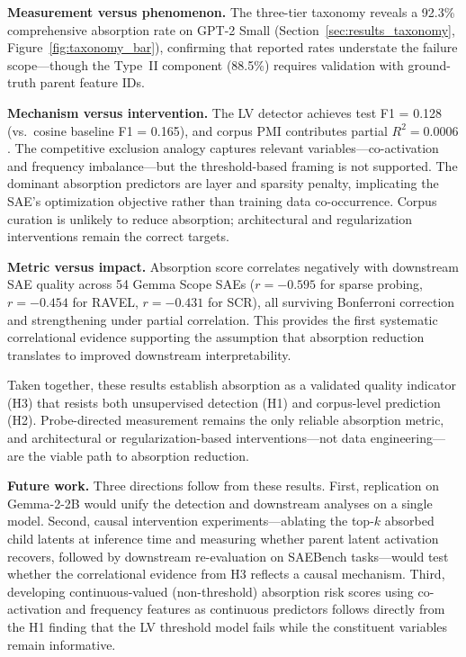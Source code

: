 \documentclass{article}
\begin{document}
\textbf{Measurement versus phenomenon.} The three-tier taxonomy reveals a 92.3\% comprehensive absorption rate on GPT-2 Small (Section~\ref{sec:results_taxonomy}, Figure~\ref{fig:taxonomy_bar}), confirming that reported rates understate the failure scope---though the Type~II component (88.5\%) requires validation with ground-truth parent feature IDs.

\textbf{Mechanism versus intervention.} The LV detector achieves test F1 = 0.128 (vs.\ cosine baseline F1 = 0.165), and corpus PMI contributes partial $R^2 = 0.0006$. The competitive exclusion analogy captures relevant variables---co-activation and frequency imbalance---but the threshold-based framing is not supported. The dominant absorption predictors are layer and sparsity penalty, implicating the SAE's optimization objective rather than training data co-occurrence. Corpus curation is unlikely to reduce absorption; architectural and regularization interventions remain the correct targets.

\textbf{Metric versus impact.} Absorption score correlates negatively with downstream SAE quality across 54 Gemma Scope SAEs ($r = -0.595$ for sparse probing, $r = -0.454$ for RAVEL, $r = -0.431$ for SCR), all surviving Bonferroni correction and strengthening under partial correlation. This provides the first systematic correlational evidence supporting the assumption that absorption reduction translates to improved downstream interpretability.

Taken together, these results establish absorption as a validated quality indicator (H3) that resists both unsupervised detection (H1) and corpus-level prediction (H2). Probe-directed measurement remains the only reliable absorption metric, and architectural or regularization-based interventions---not data engineering---are the viable path to absorption reduction.

\textbf{Future work.} Three directions follow from these results. First, replication on Gemma-2-2B would unify the detection and downstream analyses on a single model. Second, causal intervention experiments---ablating the top-$k$ absorbed child latents at inference time and measuring whether parent latent activation recovers, followed by downstream re-evaluation on SAEBench tasks---would test whether the correlational evidence from H3 reflects a causal mechanism. Third, developing continuous-valued (non-threshold) absorption risk scores using co-activation and frequency features as continuous predictors follows directly from the H1 finding that the LV threshold model fails while the constituent variables remain informative.
\end{document}
